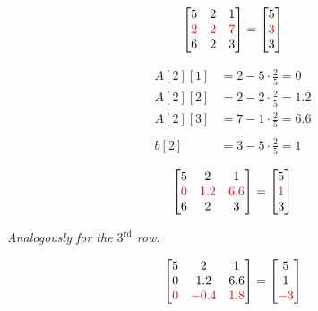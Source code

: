 \begin{align*}
    \begin{bmatrix}
        5 & 2 & 1 \\
        \color{red}2 & \color{red}2 & \color{red}7 \\
        6 & 2 & 3 \\
    \end{bmatrix}
    =
    \begin{bmatrix}
        5 \\
        \color{red}3 \\
        3 \\
    \end{bmatrix}
\end{align*}

\begin{align*}
    A[2][1] &= 2 - 5 \cdot \frac{2}{5} = 0 \\
    A[2][2] &= 2 - 2 \cdot \frac{2}{5} = 1.2 \\
    A[2][3] &= 7 - 1 \cdot \frac{2}{5} = 6.6 \\ \\
    b[2] &= 3 - 5 \cdot \frac{2}{5} = 1
\end{align*}

\begin{align*}
    \begin{bmatrix}
        5 & 2 & 1 \\
        \color{red}0 & \color{red}1.2 & \color{red}6.6 \\
        6 & 2 & 3 \\
    \end{bmatrix}
    =
    \begin{bmatrix}
        5 \\
        \color{red}1 \\
        3 \\
    \end{bmatrix}
\end{align*}

\textit{Analogously for the $\mathrm{3^{rd}}$ row.}

\begin{align*}
    \begin{bmatrix}
        5 & 2 & 1 \\
        0 & 1.2 & 6.6 \\
        \color{red}0 & \color{red}-0.4 & \color{red}1.8 \\
    \end{bmatrix}
    =
    \begin{bmatrix}
        5 \\
        1 \\
        \color{red}-3 \\
    \end{bmatrix}
\end{align*}

